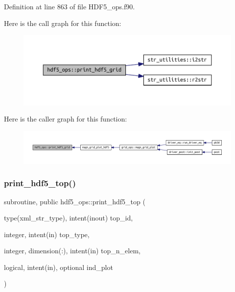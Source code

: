 Definition at line 863 of file H\+D\+F5\+\_\+ops.\+f90.

Here is the call graph for this function\+:
\nopagebreak
\begin{figure}[H]
\begin{center}
\leavevmode
\includegraphics[width=350pt]{namespacehdf5__ops_a144d595445778d89ec1a1bc0b12a94fb_cgraph}
\end{center}
\end{figure}
Here is the caller graph for this function\+:
\nopagebreak
\begin{figure}[H]
\begin{center}
\leavevmode
\includegraphics[width=350pt]{namespacehdf5__ops_a144d595445778d89ec1a1bc0b12a94fb_icgraph}
\end{center}
\end{figure}
\mbox{\label{namespacehdf5__ops_af34b4aea64a8b67ec827aaf4a7425caf}} 
\subsubsection{\texorpdfstring{print\+\_\+hdf5\+\_\+top()}{print\_hdf5\_top()}}
{\footnotesize\ttfamily subroutine, public hdf5\+\_\+ops\+::print\+\_\+hdf5\+\_\+top (\begin{DoxyParamCaption}\item[{type(xml\+\_\+str\+\_\+type), intent(inout)}]{top\+\_\+id,  }\item[{integer, intent(in)}]{top\+\_\+type,  }\item[{integer, dimension(\+:), intent(in)}]{top\+\_\+n\+\_\+elem,  }\item[{logical, intent(in), optional}]{ind\+\_\+plot }\end{DoxyParamCaption})}



